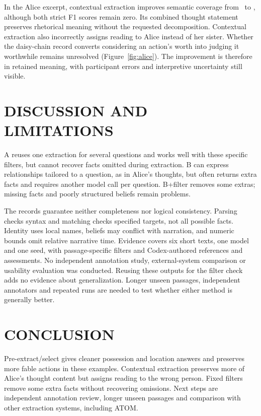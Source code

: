 \documentclass[a4paper,twoside]{article}
\begin{document}
In the Alice excerpt, contextual extraction improves semantic coverage from \AliceACoverage\ to \AliceBCoverage, although both strict F1 scores remain zero. Its combined thought statement preserves rhetorical meaning without the requested decomposition. Contextual extraction also incorrectly assigns reading to Alice instead of her sister. Whether the daisy-chain record converts considering an action's worth into judging it worthwhile remains unresolved (Figure~\ref{fig:alice}). The improvement is therefore in retained meaning, with participant errors and interpretive uncertainty still visible.









\section{\uppercase{Discussion and Limitations}}

\noindent A reuses one extraction for several questions and works well with these specific filters, but cannot recover facts omitted during extraction. B can express relationships tailored to a question, as in Alice's thoughts, but often returns extra facts and requires another model call per question. B+filter removes some extras; missing facts and poorly structured beliefs remain problems.

The records guarantee neither completeness nor logical consistency. Parsing checks syntax and matching checks specified targets, not all possible facts. Identity uses local names, beliefs may conflict with narration, and numeric bounds omit relative narrative time. Evidence covers six short texts, one model and one seed, with passage-specific filters and Codex-authored references and assessments. No independent annotation study, external-system comparison or usability evaluation was conducted. Reusing these outputs for the filter check adds no evidence about generalization. Longer unseen passages, independent annotators and repeated runs are needed to test whether either method is generally better.




\section{\uppercase{Conclusion}}
\noindent Pre-extract/select gives cleaner possession and location answers and preserves more fable actions in these examples. Contextual extraction preserves more of Alice's thought content but assigns reading to the wrong person. Fixed filters remove some extra facts without recovering omissions. Next steps are independent annotation review, longer unseen passages and comparison with other extraction systems, including ATOM.
\end{document}
